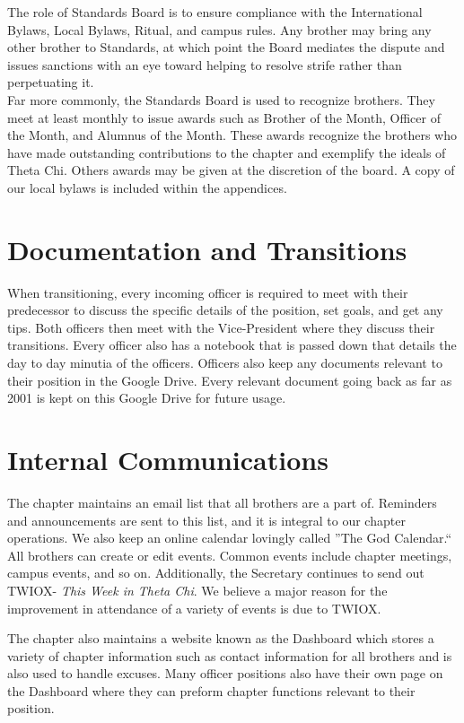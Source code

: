       The role of Standards Board is to ensure compliance with the International Bylaws, Local Bylaws, Ritual, and campus rules. Any brother may bring any other brother to Standards, at which point the Board mediates the dispute and issues sanctions with an eye toward helping to resolve strife rather than perpetuating it. \\

      Far more commonly, the Standards Board is used to recognize brothers. They meet at least monthly to issue awards such as Brother of the Month, Officer of the Month, and Alumnus of the Month. These awards recognize the brothers who have made outstanding contributions to the chapter and exemplify the ideals of Theta Chi. Others awards may be given at the discretion of the board. A copy of our local bylaws is included within the appendices. \\
      
    \section*{Documentation and Transitions}
      When transitioning, every incoming officer is required to meet with their predecessor to discuss the specific details of the position, set goals, and get any tips. Both officers then meet with the Vice-President where they discuss their transitions. Every officer also has a notebook that is passed down that details the day to day minutia of the officers. Officers also keep any documents relevant to their position in the Google Drive. Every relevant document going back as far as 2001 is kept on this Google Drive for future usage.
      
    \section*{Internal Communications}
      The chapter maintains an email list that all brothers are a part of. Reminders and announcements are sent to this list, and it is integral to our chapter operations. We also keep an online calendar lovingly called ''The God Calendar.`` All brothers can create or edit events. Common events include chapter meetings, campus events, and so on. Additionally, the Secretary continues to send out TWIOX- \textit{This Week in Theta Chi}. We believe a major reason for the improvement in attendance of a variety of events is due to TWIOX.
	  
	  The chapter also maintains a website known as the Dashboard which stores a variety of chapter information such as contact information for all brothers and is also used to handle excuses. Many officer positions also have their own page on the Dashboard where they can preform chapter functions relevant to their position.